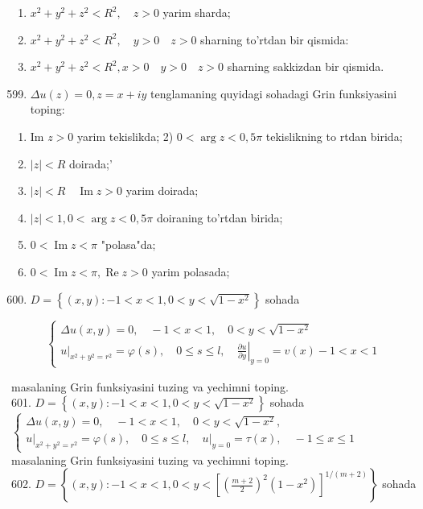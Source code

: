 \documentclass[10pt]{article}
\begin{document}
\begin{enumerate}
  \item $x^{2}+y^{2}+z^{2}<R^{2}, \quad z>0$ yarim sharda;
  \item $x^{2}+y^{2}+z^{2}<R^{2}, \quad y>0 \quad z>0$ sharning to'rtdan bir qismida:
  \item $x^{2}+y^{2}+z^{2}<R^{2}, x>0 \quad y>0 \quad z>0$ sharning sakkizdan bir qismida.
\end{enumerate}

\begin{enumerate}
  \setcounter{enumi}{598}
  \item $\Delta u(z)=0, z=x+i y$ tenglamaning quyidagi sohadagi Grin funksiyasini toping:
\end{enumerate}

\begin{enumerate}
  \item Im $z>0$ yarim tekislikda; 2) $0<\arg z<0,5 \pi$ tekislikning to rtdan birida;
  \item $|z|<R$ doirada;'
  \item $|z|<R \quad \operatorname{Im} z>0$ yarim doirada;
  \item $|z|<1,0<\arg z<0,5 \pi$ doiraning to'rtdan birida;
  \item $0<\operatorname{Im} z<\pi$ "polasa"da;
  \item $0<\operatorname{Im} z<\pi, \operatorname{Re} z>0$ yarim polasada;
\end{enumerate}

\begin{enumerate}
  \setcounter{enumi}{599}
  \item $D=\left\{(x, y):-1<x<1,0<y<\sqrt{1-x^{2}}\right\}$ sohada
\end{enumerate}

$$
\left\{\begin{array}{l}
\Delta u(x, y)=0, \quad-1<x<1, \quad 0<y<\sqrt{1-x^{2}} \\
\left.u\right|_{x^{2}+y^{2}=r^{2}}=\varphi(s), \quad 0 \leq s \leq l,\left.\quad \frac{\partial u}{\partial y}\right|_{y=0}=v(x)-1<x<1
\end{array}\right.
$$

masalaning Grin funksiyasini tuzing va yechimni toping.\\
601. $D=\left\{(x, y):-1<x<1,0<y<\sqrt{1-x^{2}}\right\}$ sohada\\
$\left\{\begin{array}{l}\Delta u(x, y)=0, \quad-1<x<1, \quad 0<y<\sqrt{1-x^{2}}, \\ \left.u\right|_{x^{2}+y^{2}=r^{2}}=\varphi(s), \quad 0 \leq s \leq l,\left.\quad u\right|_{y=0}=\tau(x), \quad-1 \leq x \leq 1\end{array}\right.$\\
masalaning Grin funksiyasini tuzing va yechimni toping.\\
602. $D=\left\{(x, y):-1<x<1,0<y<\left[\left(\frac{m+2}{2}\right)^{2}\left(1-x^{2}\right)\right]^{1 /(m+2)}\right\}$ sohada
\end{document}
